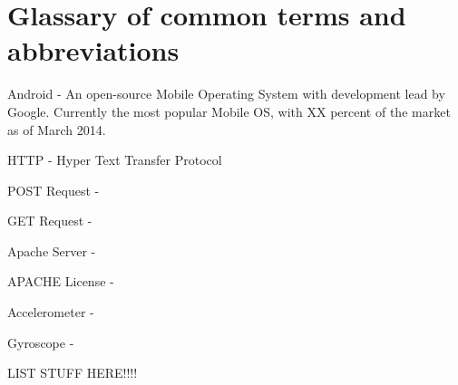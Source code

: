 \documentclass{l4proj}
\begin{document}
\section{Glassary of common terms and abbreviations}

Android - An open-source Mobile Operating System with development lead by Google. Currently the most popular Mobile OS, with XX percent of the market as of March 2014.

HTTP - Hyper Text Transfer Protocol

POST Request -

GET Request -

Apache Server -

APACHE License -

Accelerometer -

Gyroscope -

LIST STUFF HERE!!!!
\end{document}
